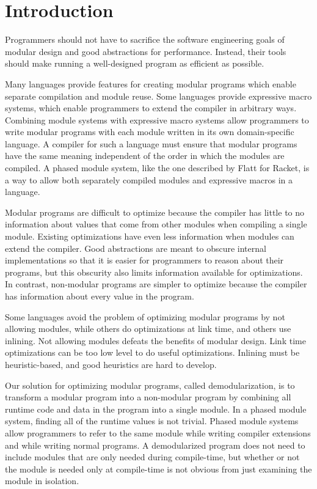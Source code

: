 \chapter{Introduction}

Programmers should not have to sacrifice the software engineering goals of modular design and good abstractions for performance. 
Instead, their tools should make running a well-designed program as efficient as possible. 

Many languages provide features for creating modular programs which enable separate compilation and module reuse.
Some languages provide expressive macro systems, which enable programmers to extend the compiler in arbitrary ways.
Combining module systems with expressive macro systems allow programmers to write modular programs with each module written in its own domain-specific language.
A compiler for such a language must ensure that modular programs have the same meaning independent of the order in which the modules are compiled.
A phased module system, like the one described by Flatt \cite{Flatt} for Racket, is a way to allow both separately compiled modules and expressive macros in a language.

Modular programs are difficult to optimize because the compiler has little to no information about values that come from other modules when compiling a single module.
Existing optimizations have even less information when modules can extend the compiler. 
Good abstractions are meant to obscure internal implementations so that it is easier for programmers to reason about their programs, but this obscurity also limits information available for optimizations.  
In contrast, non-modular programs are simpler to optimize because the compiler has information about every value in the program.

Some languages avoid the problem of optimizing modular programs by not allowing modules, while others do optimizations at link time, and others use inlining. 
Not allowing modules defeats the benefits of modular design. 
Link time optimizations can be too low level to do useful optimizations. 
Inlining must be heuristic-based, and good heuristics are hard to develop. 

Our solution for optimizing modular programs, called demodularization, is to transform a modular program into a non-modular program by combining all runtime code and data in the program into a single module.
In a phased module system, finding all of the runtime values is not trivial.
Phased module systems allow programmers to refer to the same module while writing compiler extensions and while writing normal programs.
A demodularized program does not need to include modules that are only needed during compile-time, but whether or not the module is needed only at compile-time is not obvious from just examining the module in isolation. 

